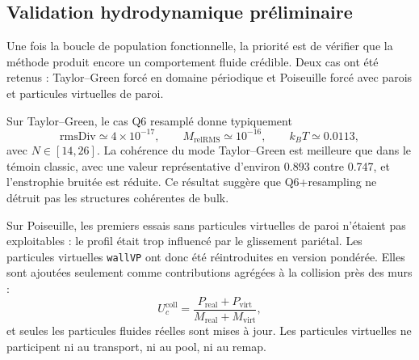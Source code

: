 \documentclass[11pt,a4paper]{article}
\begin{document}
\subsection{Validation hydrodynamique préliminaire}

Une fois la boucle de population fonctionnelle, la priorité est de vérifier que la méthode produit encore un comportement fluide crédible. Deux cas ont été retenus : Taylor--Green forcé en domaine périodique et Poiseuille forcé avec parois et particules virtuelles de paroi.

Sur Taylor--Green, le cas Q6 resamplé donne typiquement
\begin{equation}
  \mathrm{rmsDiv}\simeq 4\times 10^{-17},
  \qquad
  M_{\mathrm{relRMS}}\simeq 10^{-16},
  \qquad
  k_BT\simeq 0.0113,
\end{equation}
avec $N\in[14,26]$. La cohérence du mode Taylor--Green est meilleure que dans le témoin classic, avec une valeur représentative d'environ 0.893 contre 0.747, et l'enstrophie bruitée est réduite. Ce résultat suggère que Q6+resampling ne détruit pas les structures cohérentes de bulk.

Sur Poiseuille, les premiers essais sans particules virtuelles de paroi n'étaient pas exploitables : le profil était trop influencé par le glissement pariétal. Les particules virtuelles \texttt{wallVP} ont donc été réintroduites en version pondérée. Elles sont ajoutées seulement comme contributions agrégées à la collision près des murs :
\begin{equation}
  U_c^{\mathrm{coll}}=
  \frac{P_{\mathrm{real}}+P_{\mathrm{virt}}}{M_{\mathrm{real}}+M_{\mathrm{virt}}},
\end{equation}
et seules les particules fluides réelles sont mises à jour. Les particules virtuelles ne participent ni au transport, ni au pool, ni au remap.
\end{document}
